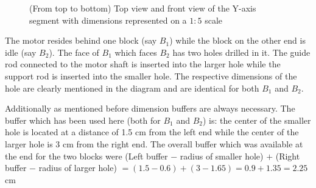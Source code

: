 \begin{figure}[h]
    \begin{center}
    \end{center} 
    \begin{center}   
    \end{center}
    \caption{(From top to bottom) Top view and front view of the Y-axis segment with dimensions represented on a $1:5$ scale}
    \label{fig:yaxis}
\end{figure}

The motor resides behind one block (say $B_{1}$) while the block on the other end is idle (say $B_{2}$). The face of $B_{1}$ which faces $B_{2}$ has two holes drilled in it. The guide rod connected to the motor shaft is inserted into the larger hole while the support rod is inserted into the smaller hole. The respective dimensions of the hole are clearly mentioned in the diagram and are identical for both $B_{1}$ and $B_{2}$. \par

Additionally as mentioned before dimension buffers are always necessary. The buffer which has been used here (both for $B_{1}$ and $B_{2}$) is: the center of the smaller hole is located at a distance of 1.5 cm from the left end while the center of the larger hole is 3 cm from the right end. The overall buffer which was available at the end for the two blocks were
(Left buffer $-$ radius of smaller hole) $+$ (Right buffer $-$ radius of larger hole)
$= (1.5 - 0.6) + (3 - 1.65)
= 0.9 + 1.35
= 2.25$ cm \par

